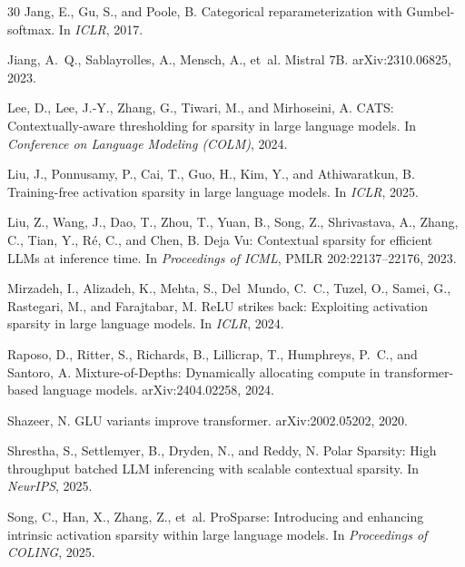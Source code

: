 \documentclass[10pt,twocolumn,letterpaper]{article}
\begin{document}
\begin{thebibliography}{30}
Jang, E., Gu, S., and Poole, B.
\newblock Categorical reparameterization with Gumbel-softmax.
\newblock In \emph{ICLR}, 2017.

Jiang, A.~Q., Sablayrolles, A., Mensch, A., et~al.
\newblock Mistral 7B.
\newblock arXiv:2310.06825, 2023.

Lee, D., Lee, J.-Y., Zhang, G., Tiwari, M., and Mirhoseini, A.
\newblock CATS: Contextually-aware thresholding for sparsity in large language models.
\newblock In \emph{Conference on Language Modeling (COLM)}, 2024.

Liu, J., Ponnusamy, P., Cai, T., Guo, H., Kim, Y., and Athiwaratkun, B.
\newblock Training-free activation sparsity in large language models.
\newblock In \emph{ICLR}, 2025.

Liu, Z., Wang, J., Dao, T., Zhou, T., Yuan, B., Song, Z., Shrivastava, A., Zhang, C., Tian, Y., R{\'e}, C., and Chen, B.
\newblock Deja Vu: Contextual sparsity for efficient LLMs at inference time.
\newblock In \emph{Proceedings of ICML}, PMLR 202:22137--22176, 2023.

Mirzadeh, I., Alizadeh, K., Mehta, S., Del~Mundo, C.~C., Tuzel, O., Samei, G., Rastegari, M., and Farajtabar, M.
\newblock ReLU strikes back: Exploiting activation sparsity in large language models.
\newblock In \emph{ICLR}, 2024.

Raposo, D., Ritter, S., Richards, B., Lillicrap, T., Humphreys, P.~C., and Santoro, A.
\newblock Mixture-of-Depths: Dynamically allocating compute in transformer-based language models.
\newblock arXiv:2404.02258, 2024.

Shazeer, N.
\newblock GLU variants improve transformer.
\newblock arXiv:2002.05202, 2020.

Shrestha, S., Settlemyer, B., Dryden, N., and Reddy, N.
\newblock Polar Sparsity: High throughput batched LLM inferencing with scalable contextual sparsity.
\newblock In \emph{NeurIPS}, 2025.

Song, C., Han, X., Zhang, Z., et~al.
\newblock ProSparse: Introducing and enhancing intrinsic activation sparsity within large language models.
\newblock In \emph{Proceedings of COLING}, 2025.


\end{thebibliography}
\end{document}
